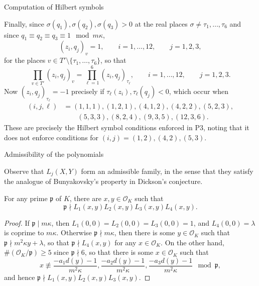 \documentclass[10pt]{beamer}
\begin{document}
\begin{frame}[t]{Computation of Hilbert symbols}

Finally, since $ \sigma(q_1), \sigma(q_2), \sigma(q_3) > 0 $ at the real places $ \sigma \ne \tau_1, \dots, \tau_6 $ and since $ q_1 \equiv q_2 \equiv q_3 \equiv 1 \mod m\kappa $,
$$ (z_i, q_j)_v = 1, \qquad i = 1, \dots, 12, \qquad j = 1, 2, 3, $$
for the places $ v \in T' \setminus \{\tau_1, \dots, \tau_6\} $, so that
$$ \prod_{v \in T'} (z_i, q_j)_v = \prod_{\ell = 1}^6 (z_i, q_j)_{\tau_\ell}, \qquad i = 1, \dots, 12, \qquad j = 1, 2, 3. $$
Now $ (z_i, q_j)_{\tau_\ell} = -1 $ precisely if $ \tau_\ell(z_i), \tau_\ell(q_j) < 0 $, which occur when
\begin{align*}
(i, j, \ell)
& = (1, 1, 1), (1, 2, 1), (4, 1, 2), (4, 2, 2), (5, 2, 3), \\
& \qquad (5, 3, 3), (8, 2, 4), (9, 3, 5), (12, 3, 6).
\end{align*}
These are precisely the Hilbert symbol conditions enforced in P3, noting that it does not enforce conditions for $ (i, j) = (1, 2), (4, 2), (5, 3) $.

\end{frame}

\begin{frame}[t]{Admissibility of the polynomials}

Observe that $ L_j(X, Y) $ form an admissible family, in the sense that they satisfy the analogue of Bunyakovsky's property in Dickson's conjecture.

\begin{lemma}[5.5]
For any prime $ \mathfrak{p} $ of $ K $, there are $ x, y \in \mathcal{O}_K $ such that
$$ \mathfrak{p} \nmid L_1(x, y)L_2(x, y)L_3(x, y)L_4(x, y). $$
\end{lemma}

\vspace{-0.5cm}

\begin{proof}
If $ \mathfrak{p} \mid m\kappa $, then $ L_1(0, 0) = L_2(0, 0) = L_3(0, 0) = 1 $, and $ L_4(0, 0) = \lambda $ is coprime to $ m\kappa $. Otherwise $ \mathfrak{p} \nmid m\kappa $, then there is some $ y \in \mathcal{O}_K $ such that $ \mathfrak{p} \nmid m^2\kappa y + \lambda $, so that $ \mathfrak{p} \nmid L_4(x, y) $ for any $ x \in \mathcal{O}_K $. On the other hand, $ \#(\mathcal{O}_K / \mathfrak{p}) \ge 5 $ since $ \mathfrak{p} \nmid 6 $, so that there is some $ x \in \mathcal{O}_K $ such that
$$ x \not\equiv \dfrac{-a_1d(y) - 1}{m^2\kappa}, \dfrac{-a_2d(y) - 1}{m^2\kappa}, \dfrac{-a_3d(y) - 1}{m^2\kappa} \mod \mathfrak{p}, $$
and hence $ \mathfrak{p} \nmid L_1(x, y)L_2(x, y)L_3(x, y) $.
\end{proof}

\end{frame}
\end{document}
